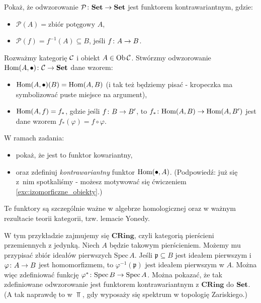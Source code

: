 \begin{exc}
  Pokaż, że odwzorowanie $\mathcal P\colon \textbf{Set}\to \textbf{Set}$ jest funktorem kontrawariantnym, gdzie:
  \begin{itemize}
    \item $\mathcal P(A) = \text{zbiór potęgowy $A$}$,
    \item $\mathcal P(f) = f^{-1}(A) \subseteq B$, jeśli $f\colon A\to B$.
  \end{itemize}
\end{exc}

\begin{exc}
  Rozważmy kategorię $\mathcal C$ i obiekt $A\in \textrm{Ob\,}{\mathcal C}$. Stwórzmy odwzorowanie $\textrm{Hom}(A, \bullet)\colon \mathcal C\to \textbf{Set}$ dane wzorem:
  \begin{itemize}
    \item $\textrm{Hom}(A, \bullet)(B) = \textrm{Hom}(A, B)$ (i tak też będziemy pisać - kropeczka ma symbolizować puste miejsce na argument),
    \item $\textrm{Hom}(A, f) = f_*$, gdzie jeśli $f\colon B\to B'$, to $f_*\colon \textrm{Hom}(A, B)\to \textrm{Hom}(A, B')$ jest dane wzorem $f_*(\varphi) = f\circ \varphi$.
  \end{itemize}
  W ramach zadania:
  \begin{itemize}
    \item pokaż, że jest to funktor kowariantny,
    \item oraz zdefiniuj \emph{kontrawariantny} funktor $\textrm{Hom}(\bullet, A)$. (Podpowiedź: już się z~nim spotkaliśmy - możesz motywować się ćwiczeniem \ref{exc:izomorficzne_obiekty}.)
  \end{itemize}
  Te funktory są szczególnie ważne w algebrze homologicznej oraz w ważnym rezultacie teorii kategorii, tzw. lemacie Yonedy.
\end{exc}

\begin{exmp}
{
  \newcommand{\CRing}{\textbf{CRing}}
  \newcommand{\Spec}[1]{\mathrm{Spec}\,#1}
  W tym przykładzie zajmujemy się $\CRing$, czyli kategorią pierścieni przemiennych z jedynką.
  Niech $A$ będzie takowym pierścieniem. Możemy mu przypisać zbiór ideałów pierwszych $\Spec A$. Jeśli $\mathfrak p\subseteq B$ jest ideałem pierwszym i $\varphi\colon A\to B$ jest homomorfizmem, to $\varphi^{-1}(\mathfrak p)$ jest ideałem pierwszym w $A$. Można więc zdefiniować funkcję $\morph{\varphi^*}{\Spec B}{\Spec A}$. Można pokazać, że tak zdefiniowane odwzorowanie jest funktorem kontrawariantnym z $\CRing$ do $\textbf{Set}$. (A tak naprawdę to w $\Top$, gdy wyposaży się spektrum w topologię Zariskiego.)
}
\end{exmp}
